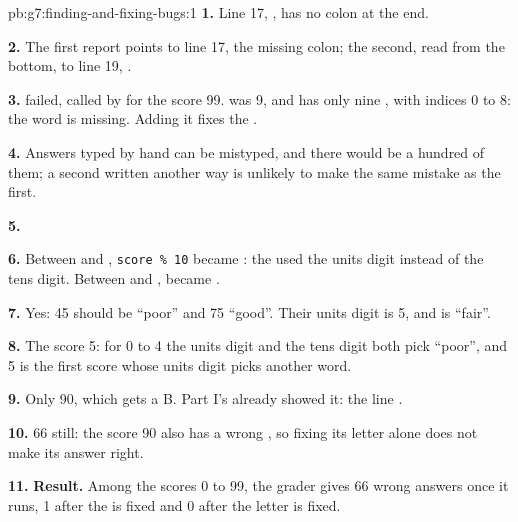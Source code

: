 \begin{solution}{pb:g7:finding-and-fixing-bugs:1}
\textbf{1.} Line 17, , has no colon at the end.

\textbf{2.} The first report points to line 17, the missing colon; the
second, read from the bottom, to line 19, .

\textbf{3.}  failed, called by  for the score 99.
 was 9, and  has only nine , with indices 0 to 8:
the word  is missing. Adding it fixes the .

\textbf{4.} Answers typed by hand can be mistyped, and there would be a
hundred of them; a second  written another way is unlikely to make
the same mistake as the first.

\textbf{5.}

\label{out:g7:finding-and-fixing-bugs:check}

\textbf{6.} Between  and , \texttt{score \% 10} became
: the  used the units digit instead of the tens
digit. Between  and ,  became
.

\textbf{7.} Yes: 45 should be ``poor'' and 75 ``good''. Their units digit is
5, and  is ``fair''.

\textbf{8.} The score 5: for 0 to 4 the units digit and the tens digit both
pick ``poor'', and 5 is the first score whose units digit picks another word.

\textbf{9.} Only 90, which gets a B. Part I's  already showed it: the
line .

\textbf{10.} 66 still: the score 90 also has a wrong , so fixing its
letter alone does not make its answer right.

\textbf{11.} \textbf{Result.} Among the scores 0 to 99, the grader gives 66
wrong answers once it runs, 1 after the  is fixed and 0 after the
letter is fixed.
\end{solution}
